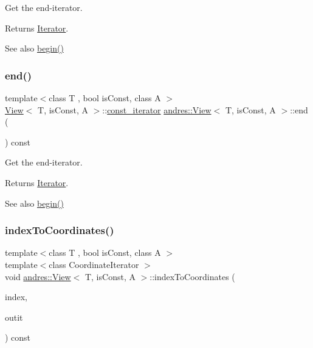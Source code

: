 Get the end-\/iterator.

\begin{DoxyReturn}{Returns}
\hyperlink{classandres_1_1Iterator}{Iterator}. 
\end{DoxyReturn}
\begin{DoxySeeAlso}{See also}
\hyperlink{classandres_1_1View_acd1f71e27ea01d536e1539877afedfa9}{begin()} 
\end{DoxySeeAlso}
\mbox{\label{classandres_1_1View_addbf9af2a1a8cce107881ffbfe0e84ca}} 
\subsubsection{\texorpdfstring{end()}{end()}\hspace{0.1cm}{\footnotesize\ttfamily [2/2]}}
{\footnotesize\ttfamily template$<$class T , bool is\+Const, class A $>$ \\
\hyperlink{classandres_1_1View}{View}$<$ T, is\+Const, A $>$\+::\hyperlink{classandres_1_1View_a7b6f125a7b3830f30cd34887b61858a7}{const\+\_\+iterator} \hyperlink{classandres_1_1View}{andres\+::\+View}$<$ T, is\+Const, A $>$\+::end (\begin{DoxyParamCaption}{ }\end{DoxyParamCaption}) const\hspace{0.3cm}{\ttfamily [inline]}}

Get the end-\/iterator.

\begin{DoxyReturn}{Returns}
\hyperlink{classandres_1_1Iterator}{Iterator}. 
\end{DoxyReturn}
\begin{DoxySeeAlso}{See also}
\hyperlink{classandres_1_1View_acd1f71e27ea01d536e1539877afedfa9}{begin()} 
\end{DoxySeeAlso}
\mbox{\label{classandres_1_1View_a4162a6266478800ff5f64998b3a703fb}} 
\subsubsection{\texorpdfstring{index\+To\+Coordinates()}{indexToCoordinates()}}
{\footnotesize\ttfamily template$<$class T , bool is\+Const, class A $>$ \\
template$<$class Coordinate\+Iterator $>$ \\
void \hyperlink{classandres_1_1View}{andres\+::\+View}$<$ T, is\+Const, A $>$\+::index\+To\+Coordinates (\begin{DoxyParamCaption}\item[{std\+::size\+\_\+t}]{index,  }\item[{Coordinate\+Iterator}]{outit }\end{DoxyParamCaption}) const\hspace{0.3cm}{\ttfamily [inline]}}


